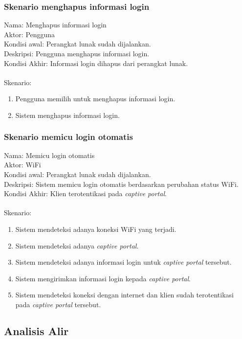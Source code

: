 \subsubsection{Skenario menghapus informasi login}
Nama: Menghapus informasi login\\
Aktor: Pengguna\\
Kondisi awal: Perangkat lunak sudah dijalankan.\\
Deskripsi: Pengguna menghapus informasi login.\\
Kondisi Akhir: Informasi login dihapus dari perangkat lunak.\\\\
Skenario:
\begin{enumerate}
    \item{Pengguna memilih untuk menghapus informasi login.}
    \item{Sistem menghapus informasi login.}
\end{enumerate}

\subsubsection{Skenario memicu login otomatis}
Nama: Memicu login otomatis\\
Aktor: WiFi\\
Kondisi awal: Perangkat lunak sudah dijalankan.\\
Deskripsi: Sistem memicu login otomatis berdasarkan perubahan status WiFi.\\
Kondisi Akhir: Klien terotentikasi pada \textit{captive portal}.\\\\
Skenario:
\begin{enumerate}
    \item{Sistem mendeteksi adanya koneksi WiFi yang terjadi.}
    \item{Sistem mendeteksi adanya \textit{captive portal}.}
    \item{Sistem mendeteksi adanya informasi login untuk \textit{captive portal} tersebut.}
    \item{Sistem mengirimkan informasi login kepada \textit{captive portal}.}
    \item{Sistem mendeteksi koneksi dengan internet dan klien sudah terotentikasi pada \textit{captive portal} tersebut.}
\end{enumerate}

\subsection{Analisis Alir}
\label{sec:analisis_alir}

